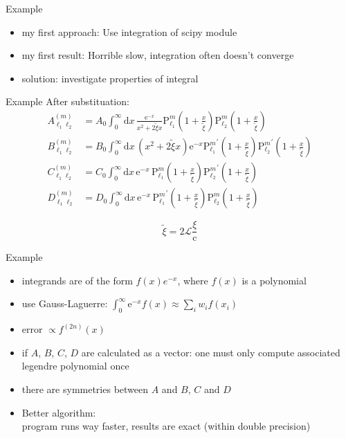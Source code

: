 \documentclass[12pt,compress,mathserif]{beamer}
\newcommand{\Plm}[2]{{\text{P}_{#1}^{#2}}}
\renewcommand{\c}{\mathrm{c}}
\newcommand{\e}{\mathrm{e}}
\begin{document}
\begin{frame}{Example}
    \begin{itemize}
        \item my first approach: Use integration of scipy module
        \item my first result: Horrible slow, integration often doesn't converge 
        \item solution: investigate properties of integral
    \end{itemize}
\end{frame}

\begin{frame}{Example}
After substituation:
\begin{align}
\nonumber
A_{\ell_1 \ell_2}^{(m)} &= A_0 \int_0^\infty \mathrm{d}x \, \frac{\e^{-x}}{x^2+2\tilde\xi x} \Plm{\ell_1}{m}\left( 1+\frac{x}{\tilde\xi} \right) \Plm{\ell_2}{m}\left( 1+\frac{x}{\tilde\xi} \right) \\
\nonumber
B_{\ell_1 \ell_2}^{(m)} &= B_0 \int_0^\infty \mathrm{d}x \, \left(x^2+2\tilde\xi x\right) \e^{-x} \Plm{\ell_1}{m}^\prime\left( 1+\frac{x}{\tilde\xi} \right) \Plm{\ell_2}{m}^\prime\left( 1+\frac{x}{\tilde\xi} \right) \\
\nonumber
C_{\ell_1 \ell_2}^{(m)} &= C_0 \int_0^\infty \mathrm{d}x \, \e^{-x} \, \Plm{\ell_1}{m}\left( 1+\frac{x}{\tilde\xi} \right) \Plm{\ell_2}{m}^\prime\left( 1+\frac{x}{\tilde\xi} \right) \\
\nonumber
D_{\ell_1 \ell_2}^{(m)} &= D_0 \int_0^\infty \mathrm{d}x \, \e^{-x} \, {\Plm{\ell_1}{m}}^\prime\left( 1+\frac{x}{\tilde\xi} \right) \Plm{\ell_2}{m}\left( 1+\frac{x}{\tilde\xi} \right)
\end{align}

\begin{equation}
\nonumber
\tilde\xi = 2\mathcal{L}\frac{\xi}{\c}
\end{equation}
\end{frame}

\begin{frame}{Example}
\begin{itemize}
    \item integrands are of the form $f(x) e^{-x}$, where $f(x)$ is a polynomial
    \item use Gauss-Laguerre: $\int_0^\infty \e^{-x} f(x) \approx \sum_i w_i f(x_i)$
    \item error $\propto f^{(2n)}(x)$
    \item if $A$, $B$, $C$, $D$ are calculated as a vector: one must only compute associated legendre polynomial once
    \item there are symmetries between $A$ and $B$, $C$ and $D$
    \item Better algorithm:\\ program runs way faster, results are exact (within double precision)
\end{itemize}
\end{frame}
\end{document}
